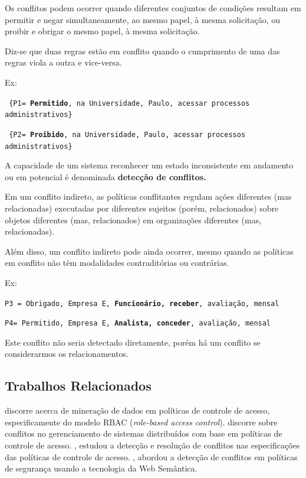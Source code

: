 Os conflitos podem ocorrer quando diferentes conjuntos de condições resultam em permitir e negar simultaneamente, ao mesmo papel, à mesma solicitação, ou proibir e obrigar o mesmo papel, à mesma solicitação.

Diz-se que duas regras estão em conflito quando o cumprimento de uma das regras viola a outra e vice-versa. 

Ex:

{\scriptsize \texttt{ \{P1= {\textbf{Permitido}, na Universidade, Paulo, acessar processos administrativos\} }}}

{\scriptsize \texttt{ \{P2= {\textbf{Proibido}, na Universidade, Paulo, acessar processos administrativos\} }}}

A capacidade de um sistema reconhecer um estado inconsistente em andamento ou em potencial é denominada \textbf{detecção de conflitos.}

Em um conflito indireto, as políticas conflitantes regulam ações diferentes (mas relacionadas) executadas por diferentes sujeitos (porém, relacionados) sobre objetos diferentes (mas, relacionados) em organizações diferentes (mas, relacionadas). 

Além disso, um conflito indireto pode ainda ocorrer, mesmo quando as políticas em conflito não têm modalidades contraditórias ou contrárias.

Ex:

{\scriptsize \texttt{P3 = {Obrigado, Empresa E, \textbf{Funcionário, receber}, avaliação, mensal}}}

{\scriptsize \texttt{P4= {Permitido, Empresa E, \textbf{Analista, conceder}, avaliação, mensal}}}

Este conflito não seria detectado diretamente, porém há um conflito se considerarmos os relacionamentos.

\subsection{Trabalhos Relacionados}\label{trabalhos_relacionados}
\cite{bui_efficient_2019} discorre acerca de mineração de dados em políticas de controle de acesso, especificamente do modelo RBAC (\textit{role-based access control}). \cite{lupu_conflicts_1999} discorre sobre conflitos no gerenciamento de sistemas distribuídos com base em políticas de controle de acesso. \cite{koch_conflict_2002}, estudou a detecção e resolução de conflitos nas especificações das políticas de controle de acesso. \cite{neri_conflict_2012}, abordou a detecção de conflitos em políticas de segurança usando a tecnologia da Web Semântica.

